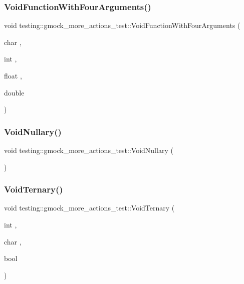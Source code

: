 \subsubsection{\texorpdfstring{VoidFunctionWithFourArguments()}{VoidFunctionWithFourArguments()}}
{\footnotesize\ttfamily void testing\+::gmock\+\_\+more\+\_\+actions\+\_\+test\+::\+Void\+Function\+With\+Four\+Arguments (\begin{DoxyParamCaption}\item[{char}]{,  }\item[{int}]{,  }\item[{float}]{,  }\item[{double}]{ }\end{DoxyParamCaption})}

\mbox{\label{namespacetesting_1_1gmock__more__actions__test_a061f6d66383a4e793b4d4ca93bd8ca2f}} 
\subsubsection{\texorpdfstring{VoidNullary()}{VoidNullary()}}
{\footnotesize\ttfamily void testing\+::gmock\+\_\+more\+\_\+actions\+\_\+test\+::\+Void\+Nullary (\begin{DoxyParamCaption}{ }\end{DoxyParamCaption})}

\mbox{\label{namespacetesting_1_1gmock__more__actions__test_ac41b49dc8ab365ccad7b332796421cd4}} 
\subsubsection{\texorpdfstring{VoidTernary()}{VoidTernary()}}
{\footnotesize\ttfamily void testing\+::gmock\+\_\+more\+\_\+actions\+\_\+test\+::\+Void\+Ternary (\begin{DoxyParamCaption}\item[{int}]{,  }\item[{char}]{,  }\item[{bool}]{ }\end{DoxyParamCaption})}

